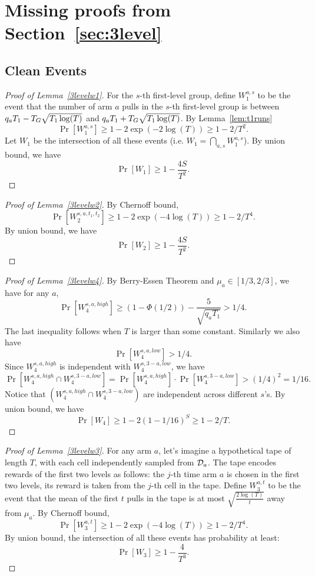 \section{Missing proofs from Section~\ref{sec:3level}}

\subsection{Clean Events}


\begin{proof}[Proof of Lemma~\ref{3levelw1}]
  For the $s$-th first-level group, define $W_1^{a,s}$ to be the event
  that the number of arm $a$ pulls in the $s$-th first-level group is
  between $q_a T_1- T_G \sqrt{T_1\log(T)}$ and
  $q_a T_1 + T_G \sqrt{T_1\log(T)}$. By Lemma~\ref{lem:t1runs}
\[
\Pr[W_1^{a,s}] \geq 1-2\exp(-2\log(T)) \geq 1-2/T^2.
\]
Let $W_1$  be the intersection of all these events (i.e.
$W_1 = \bigcap_{a,s}W_1^{a,s}$). By union bound, we have
\[
\Pr[W_1] \geq 1- \frac{4S}{T^2}.
\]
\end{proof}



\begin{proof}[Proof of Lemma~\ref{3levelw2}]
  By Chernoff bound,
\[
\Pr[W_2^{s,a,t_1,t_2}] \geq 1 - 2\exp(-4\log(T)) \geq 1- 2/T^4.
\]
By union bound, we have
\[
\Pr[W_2] \geq 1- \frac{4S}{T^2}.
\]
\end{proof}


\begin{proof}[Proof of Lemma~\ref{3levelw4}]
By Berry-Essen Theorem and
  $\mu_a \in [1/3,2/3]$, we have for any $a$,
\[
\Pr[W_4^{s,a,high}] \geq (1-\Phi(1/2)) - \frac{5}{\sqrt{q_aT_1}} > 1/4.
\]
The last inequality follows when $T$ is larger than some constant.
Similarly we also have 
\[
\Pr[W_4^{s,a,low}] > 1/4.
\]
Since $W_4^{s,a,high}$ is independent with $W_4^{s,3-a,low}$, we have
\[
\Pr[W_4^{s,a,high} \cap W_4^{s,3-a,low}] =\Pr[W_4^{s,a,high}] \cdot  \Pr[W_4^{s,3-a,low}]>(1/4)^2 = 1/16.
\]
Notice that $(W_4^{s,a,high} \cap W_4^{s,3-a,low})$ are independent
across different $s$'s. By union bound, we have
\[
\Pr[W_4] \geq 1- 2(1-1/16)^S \geq 1 -2 /T.
\]
\end{proof}



\begin{proof}[Proof of Lemma~\ref{3levelw3}]
  For any arm $a$, let's imagine a hypothetical tape of length $T$,
  with each cell independently sampled from $\mathcal{D}_a$. The tape encodes
  rewards of the first two levels as follows: the $j$-th time arm $a$
  is chosen in the first two levels, its reward is taken from the
  $j$-th cell in the tape. Define $W_3^{a,t}$ to be the event that the
  mean of the first $t$ pulls in the tape is at most
  $\sqrt{\frac{2\log(T)}{t}}$ away from $\mu_a$. By Chernoff bound,
\[
\Pr[W_3^{a,t}] \geq 1 - 2\exp(-4\log(T)) \geq 1- 2/T^4.
\]
By union bound, the intersection of all these events has probability
at least:
\[
\Pr[W_3] \geq 1- \frac{4}{T^3}.
\]
\end{proof}

